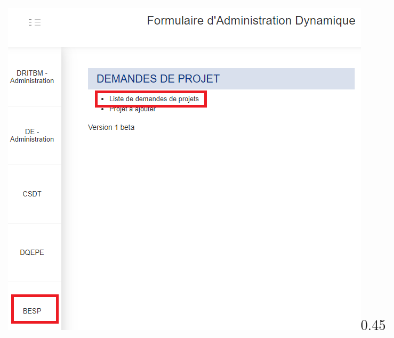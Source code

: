 \documentclass[aspectratio=169]{beamer}%
\let\note\relax
\begin{document}
\begin{frame}
\begin{columns}
   \begin{annotate}{\includegraphics[width=0.7\textwidth]{home_list}}{0.45}
    \end{annotate}
 \end{columns}   
\end{frame}
\end{document}
